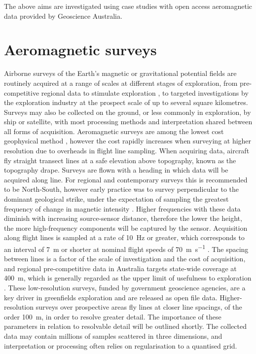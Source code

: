 \documentclass[manuscript.tex]{subfiles}
\begin{document}
The above aims are investigated using case studies with open access aeromagnetic data provided by Geoscience Australia.

\section{Aeromagnetic surveys}
\label{sec:introgeo}
Airborne surveys of the Earth's magnetic or gravitational potential fields are routinely acquired at a range of scales at different stages of exploration, from pre-competitive regional data to stimulate exploration \parencite{howardAirborneGeophysicalCoverage2004}, to targeted investigations by the exploration industry at the prospect scale of up to several square kilometres.
Surveys may also be collected on the ground, or less commonly in exploration, by ship or satellite, with most processing methods and interpretation shared between all forms of acquisition.
Aeromagnetic surveys are among the lowest cost geophysical method \parencite{dentithGeophysicsMineralExploration2014}, however the cost rapidly increases when surveying at higher resolution due to overheads in flight line sampling.
When acquiring data, aircraft fly straight transect lines at a safe elevation above topography, known as the topography drape.
Surveys are flown with a heading in which data will be acquired along line.
For regional and contemporary surveys this is recommended to be North-South, however early practice was to survey perpendicular to the dominant geological strike, under the expectation of sampling the greatest frequency of change in magnetic intensity \parencite{islesGeologicalInterpretationAeromagnetic2018}.
Higher frequencies with these data diminish with increasing source-sensor distance, therefore the lower the height, the more high-frequency components will be captured by the sensor.
Acquisition along flight lines is sampled at a rate of \qty{10}{\hertz} or greater, which corresponds to an interval of \qty{7}{\m} or shorter at nominal flight speeds of \qty{70}{\m\per\s} \parencite{goodwinAirborneMagneticRadiometric2023}.
The spacing between lines is a factor of the scale of investigation and the cost of acquisition, and regional pre-competitive data in Australia targets state-wide coverage at \qty{400}{\m}, which is generally regarded as the upper limit of usefulness to exploration \parencite{howardAirborneGeophysicalCoverage2004}.
These low-resolution surveys, funded by government geoscience agencies, are a key driver in greenfields exploration and are released as open file data.
Higher-resolution surveys over prospective areas fly lines at closer line spacings, of the order \qty{100}{\m}, in order to resolve greater detail.
The importance of these parameters in relation to resolvable detail will be outlined shortly.
The collected data may contain millions of samples scattered in three dimensions, and interpretation or processing often relies on regularisation to a quantised grid.
\end{document}
